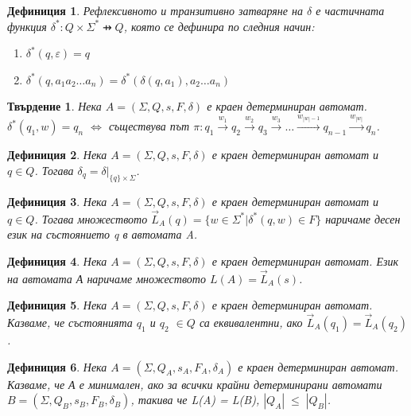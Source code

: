 \documentclass[a4paper,12pt]{article}
\newtheorem{stm}{Твърдение}[section]
\newtheorem{defn}{Дефиниция}[section]
\begin{document}
\begin{defn}
Рефлексивното и транзитивно затваряне на $\delta$ е частичната функция $\delta^* : Q \times \Sigma^* \pfun Q $, която се дефинира по следния начин:
\begin{enumerate}
 \item[1)] $\delta^*(q, \varepsilon) = q$
 \item[2)] $\delta^*(q, a_1 a_2 \ldots a_n) = \delta^*(\delta(q, a_1), a_2 \ldots a_n)$
\end{enumerate}
\end{defn}

\begin{stm}
Нека $A = (\Sigma, Q, s, F, \delta)$ е краен детерминиран автомат. \\$\delta^*(q_1, w) = q_n$ $\Leftrightarrow$ съществува път
$\pi: q_1 \xrightarrow{w_1} q_2 \xrightarrow{w_2} q_3 \xrightarrow{w_3} \ldots \xrightarrow{w_{|w| - 1}} q_{n - 1} \xrightarrow{w_{|w|}} q_n$.
\end{stm}

\begin{defn}
Нека $A = (\Sigma, Q, s, F, \delta)$ е краен детерминиран автомат и $q \in Q$. Тогава $\delta_q = \left.{\delta}\right|_{\{q\} \times \Sigma}$.
\end{defn}

\begin{defn}
Нека $A = (\Sigma, Q, s, F, \delta)$ е краен детерминиран автомат и $q \in Q$. Тогава множеството
$\vec{L}_A(q) = \{w \in \Sigma^* | \delta^*(q, w) \in F\}$ наричаме десен език на състоянието q в автомата A.
\end{defn}

\begin{defn}
Нека $A = (\Sigma, Q, s, F, \delta)$ е краен детерминиран автомат. Език на автомата А наричаме множеството
$L(A) = \vec{L}_A(s)$.
\end{defn}

\begin{defn}
Нека $A = (\Sigma, Q, s, F, \delta)$ е краен детерминиран автомат. Казваме, че състоянията $q_1$ и $q_2$ $\in Q$ са еквивалентни,
ако $\vec{L}_A(q_1) = \vec{L}_A(q_2)$.
\end{defn}

\begin{defn}
Нека $A = (\Sigma, Q_A, s_A, F_A, \delta_A)$ е краен детерминиран автомат. Казваме, че А е минимален, ако за всички
крайни детерминирани автомати $B = (\Sigma, Q_B, s_B, F_B, \delta_B)$, такива че L(A) = L(B), $|Q_A|\;\leq\;|Q_B|$.
\end{defn}
\end{document}
